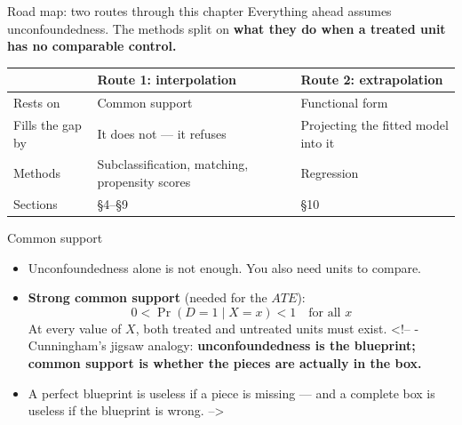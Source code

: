 \documentclass[
  11pt,
  ignorenonframetext,
  aspectratio=169,
]{beamer}
\providecommand{\tightlist}{%
  \setlength{\itemsep}{0pt}\setlength{\parskip}{0pt}}
\begin{document}
\begin{frame}{Road map: two routes through this chapter}
\protect{}\label{road-map-two-routes-through-this-chapter}
Everything ahead assumes unconfoundedness. The methods split on
\textbf{what they do when a treated unit has no comparable control.}

\begin{center}
\begin{tabular}{lp{4.3cm}p{4.3cm}}
\toprule
 & \textbf{Route 1: interpolation} & \textbf{Route 2: extrapolation} \\
\midrule
Rests on       & Common support & Functional form \\
Fills the gap by & It does not --- it refuses & Projecting the fitted model into it \\
Methods        & Subclassification, matching, propensity scores & Regression \\
Sections       & §4--§9 & §10 \\
\bottomrule
\end{tabular}
\end{center}
\end{frame}

\begin{frame}{Common support}
\protect{}\label{common-support}
\begin{itemize}
\tightlist
\item
  Unconfoundedness alone is not enough. You also need units to compare.
\item
  \textbf{Strong common support} (needed for the \(ATE\)): \[
  0 < \Pr(D=1 \mid X = x) < 1 \quad \text{for all } x
  \] At every value of \(X\), both treated and untreated units must
  exist. \textless!-- - Cunningham's jigsaw analogy:
  \textbf{unconfoundedness is the blueprint; common support is whether
  the pieces are actually in the box.}
\item
  A perfect blueprint is useless if a piece is missing --- and a
  complete box is useless if the blueprint is wrong. --\textgreater{}
\end{itemize}
\end{frame}
\end{document}
